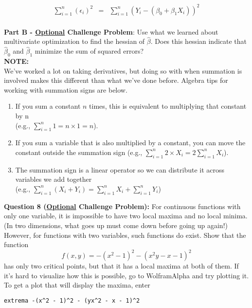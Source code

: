 \documentclass[10pt]{amsart}
\begin{document}
 \begin{eqnarray*}
 \sum_{i=1}^n (\epsilon_i)^2 &=& \sum_{i=1}^n (Y_i - (\beta_0 + \beta_1 X_i))^2\\
 \end{eqnarray*}
 
 \textbf{Part B - \underline{Optional} Challenge Problem}: Use what we learned about multivariate optimization to find the hessian of $\hat \beta$. Does this hessian indicate that $\hat \beta_0$ and $\hat \beta_1$ minimize the sum of squared errors?\\
 
 \textbf{NOTE:}\\
 We've worked a lot on taking derivatives, but doing so with when summation is involved makes this different than what we've done before. Algebra tips for working with summation signs are below.\\
 \begin{enumerate}
\item  If you sum a constant $n$ times, this is equivalent to multiplying that constant by n\\ (e.g., $\sum_{i=1}^n 1 = n\times1 = n$).
\item If you sum a variable that is also multiplied by a constant, you can move the constant outside the summation sign (e.g., $\sum_{i=1}^n 2 \times X_i = 2\sum_{i=1}^n X_i$).
\item The summation sign is a linear operator so we can distribute it across variables we add together \\(e.g., $\sum_{i=1}^n (X_i + Y_i) =  \sum_{i=1}^n X_i +  \sum_{i=1}^n Y_i$) \\
\end{enumerate}
\bigskip

\textbf{Question 8 (\underline{Optional} Challenge Problem):} For continuous functions with only one variable, it is impossible to have two local maxima and no local minima. (In two dimensions, what goes up must come down before going up again!) However, for functions with two variables, such functions do exist. Show that the function
$$f(x,y) = -(x^2-1)^2 - (x^2y-x-1)^2$$
has only two critical points, but that it has a local maxima at both of them. If it's hard to visualize how this is possible, go to WolframAlpha and try plotting it. To get a plot that will display the maxima, enter 

\begin{center}\verb+extrema -(x^2 - 1)^2 - (yx^2 - x - 1)^2+
\end{center}
\end{document}
